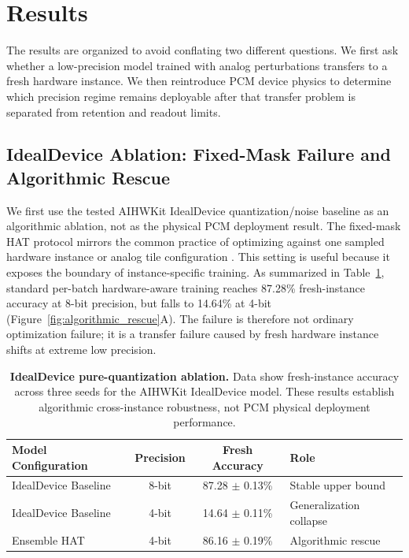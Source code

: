 \section{Results}
\label{sec:results}

The results are organized to avoid conflating two different questions. We first ask whether a low-precision model trained with analog perturbations transfers to a fresh hardware instance. We then reintroduce PCM device physics to determine which precision regime remains deployable after that transfer problem is separated from retention and readout limits.

\subsection{IdealDevice Ablation: Fixed-Mask Failure and Algorithmic Rescue}
\label{subsec:failure-rescue}

We first use the tested AIHWKit IdealDevice quantization/noise baseline as an algorithmic ablation, not as the physical PCM deployment result. The fixed-mask HAT protocol mirrors the common practice of optimizing against one sampled hardware instance or analog tile configuration \citep{joshi2020accurate,rasch2021aihwkit}. This setting is useful because it exposes the boundary of instance-specific training. As summarized in Table~\ref{tab:algorithmic_rescue}, standard per-batch hardware-aware training reaches 87.28\% fresh-instance accuracy at 8-bit precision, but falls to 14.64\% at 4-bit (Figure~\ref{fig:algorithmic_rescue}A). The failure is therefore not ordinary optimization failure; it is a transfer failure caused by fresh hardware instance shifts at extreme low precision.

\begin{table}[htbp]
\centering
\caption{\textbf{IdealDevice pure-quantization ablation.} Data show fresh-instance accuracy across three seeds for the AIHWKit IdealDevice model. These results establish algorithmic cross-instance robustness, not PCM physical deployment performance.}
\label{tab:algorithmic_rescue}
\begin{tabular}{lccl}
\toprule
\textbf{Model Configuration} & \textbf{Precision} & \textbf{Fresh Accuracy} & \textbf{Role} \\
\midrule
IdealDevice Baseline & 8-bit & 87.28 $\pm$ 0.13\% & Stable upper bound \\
IdealDevice Baseline & 4-bit & 14.64 $\pm$ 0.11\% & Generalization collapse \\
Ensemble HAT & 4-bit & 86.16 $\pm$ 0.19\% & Algorithmic rescue \\
\bottomrule
\end{tabular}
\end{table}

